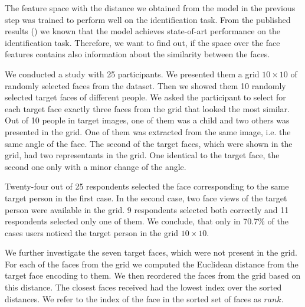 The feature space with the distance we obtained from the model in the previous step was trained to perform well on the identification task. From the published results (\cite{}) we known that the model achieves state-of-art performance on the identification task. Therefore, we want to find out, if the space over the face features contains also information about the similarity between the faces. 

We conducted a study with 25 participants. We presented them a grid $10\times10$ of randomly selected faces from the dataset. 
Then we showed them 10 randomly selected target faces of different people. We asked the participant to select for each target face exactly three faces from the grid that looked the most similar. Out of 10 people in target images, one of them was a child and two others was presented in the grid.
One of them was extracted from the same image, i.e. the same angle of the face. The second of the target faces, which were shown in the grid, had two representants in the grid. One identical to the target face, the second one only with a minor change of the angle.

Twenty-four out of 25 respondents selected the face corresponding to the same target person in the first case. In the second case, two face views of the target person were available in the grid. 9 respondents selected both correctly and 11 respondents selected only one of them. We conclude, that only in 70.7\% of the cases users noticed the target person in the grid $10\times10$.

We further investigate the seven target faces, which were not present in the grid. For each of the faces from the grid we computed the Euclidean distance from the target face encoding to them. We then reordered the faces from the grid based on this distance. The closest faces received had the lowest index over the sorted distances. We refer to the index of the face in the sorted set of faces as $rank$.

